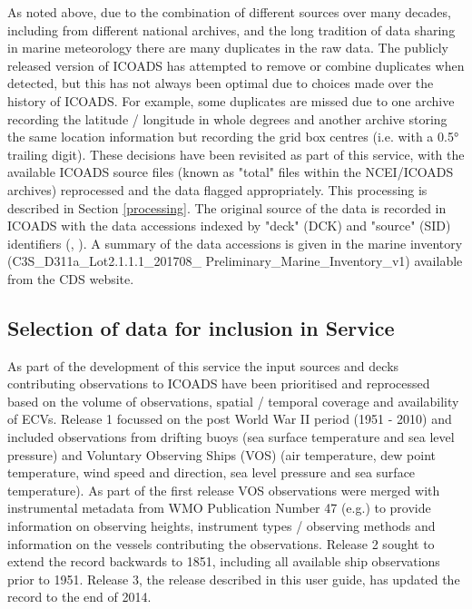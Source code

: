 As noted above, due to the combination of different sources over many decades, including from different national archives, and the long tradition of data sharing in marine meteorology there are many duplicates in the raw data. 
The publicly released version of ICOADS has attempted to remove or combine duplicates when detected, but this has not always been optimal due to choices made over the history of ICOADS. 
For example, some duplicates are missed due to one archive recording the latitude / longitude in whole degrees and another archive storing the same location information but recording the grid box centres (i.e. with a 0.5° trailing digit). 
These decisions have been revisited as part of this service, with the available ICOADS source files (known as "total" files within the NCEI/ICOADS archives) reprocessed and the data flagged appropriately.
This processing is described in Section \ref{processing}.
The original source of the data is recorded in ICOADS with the data accessions indexed by "deck" (DCK) and "source" (SID) identifiers (\cite{Woodruff1987}, \cite{Freeman2017}). 
A summary of the data accessions is given in the marine inventory (C3S\_D311a\_Lot2.1.1.1\_201708\_ Preliminary\_Marine\_Inventory\_v1) available from the CDS website.

\subsection{Selection of data for inclusion in Service}
As part of the development of this service the input sources and decks contributing observations to ICOADS have been prioritised and reprocessed based on the volume of observations, spatial / temporal coverage and availability of ECVs. 
Release 1 focussed on the post World War II period (1951 - 2010) and included observations from drifting buoys (sea surface temperature and sea level pressure) and Voluntary Observing Ships (VOS) (air temperature, dew point temperature, wind speed and direction, sea level pressure and sea surface temperature).
As part of the first release VOS observations were merged with instrumental metadata from WMO Publication Number 47 (e.g.\cite{Kent2007}) to provide information on observing heights, instrument types / observing methods and information on the vessels contributing the observations. 
Release 2 sought to extend the record backwards to 1851, including all available ship observations prior to 1951. 
Release 3, the release described in this user guide, has updated the record to the end of 2014. 

